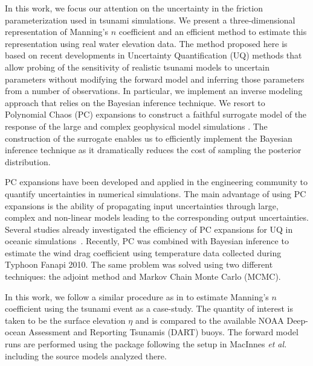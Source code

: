In this work, we focus our attention on the uncertainty in the friction
parameterization used in tsunami simulations. We present a three-dimensional 
representation of Manning's $n$ coefficient and an efficient method
to estimate this representation using real water elevation data. The method proposed here 
is based on recent developments in Uncertainty Quantification (UQ) methods that allow 
probing of the sensitivity of realistic tsunami  models to uncertain parameters
without modifying the forward model and inferring those parameters
from a number of observations.  In particular, we implement an inverse modeling
approach that relies on the Bayesian inference technique.  We resort to
Polynomial Chaos (PC) expansions to construct a faithful surrogate model of the
response of the large and complex geophysical model simulations .
The construction of the surrogate enables us to efficiently implement the Bayesian
inference technique as it dramatically reduces the cost of sampling the
posterior distribution.

PC expansions have been developed and applied in the engineering community to
quantify uncertainties in numerical simulations.  The main advantage of
using PC expansions is the ability of propagating input uncertainties through 
large, complex and non-linear models leading to the corresponding output uncertainties. 
Several studies already investigated the efficiency of PC expansions for 
UQ in oceanic simulations~\citep{thacker2012,ashwanth2010,Alexanderian2012}. 
Recently, PC was combined with Bayesian inference to estimate the wind drag coefficient 
using temperature data collected during Typhoon Fanapi 2010. The same problem was 
solved using two different techniques: the adjoint method and Markov Chain Monte Carlo
(MCMC)\cite{sraj:2013a,sraj:2013b}.

In this work, we follow a similar procedure as in \cite{sraj:2013a,sraj:2013b}
to estimate Manning's $n$ coefficient using the \tohoku tsunami
event as a case-study. The quantity of interest is taken to be the surface
elevation $\eta$ and is compared to the available NOAA Deep-ocean Assessment and
Reporting Tsunamis (DART) buoys.  The forward model runs are performed using the
\geoclaw package following the setup in MacInnes \emph{et al.}~\cite{MacInnes:2013cr} including the
source models analyzed there.

